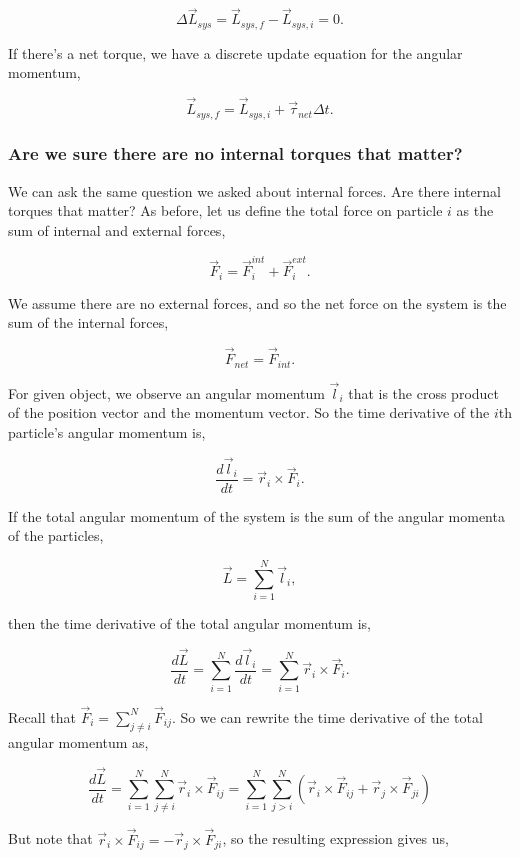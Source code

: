 \documentclass[11pt]{article}
\begin{document}
\[\Delta \vec{L}_{sys} = \vec{L}_{sys,f} - \vec{L}_{sys,i} = 0.\]

If there's a net torque, we have a discrete update equation for the
angular momentum,

\[\vec{L}_{sys,f} = \vec{L}_{sys,i} + \vec{\tau}_{net}\Delta t.\]

\subsubsection{Are we sure there are no internal torques that
matter?}\label{are-we-sure-there-are-no-internal-torques-that-matter}

We can ask the same question we asked about internal forces. Are there
internal torques that matter? As before, let us define the total force
on particle \(i\) as the sum of internal and external forces,

\[\vec{F}_{i} = \vec{F}_{i}^{int} + \vec{F}_{i}^{ext}.\]

We assume there are no external forces, and so the net force on the
system is the sum of the internal forces,

\[\vec{F}_{net} = \vec{F}_{int}.\]

For given object, we observe an angular momentum \(\vec{l}_i\) that is
the cross product of the position vector and the momentum vector. So the
time derivative of the \(i\)th particle's angular momentum is,

\[\dfrac{d\vec{l}_i}{dt} = \vec{r}_i \times \vec{F}_i.\]

If the total angular momentum of the system is the sum of the angular
momenta of the particles,

\[\vec{L} = \sum_{i=1}^{N} \vec{l}_i,\]

then the time derivative of the total angular momentum is,

\[\dfrac{d\vec{L}}{dt} = \sum_{i=1}^{N} \dfrac{d\vec{l}_i}{dt} = \sum_{i=1}^{N} \vec{r}_i \times \vec{F}_i.\]

Recall that \(\vec{F}_i = \sum_{j\neq i}^{N} \vec{F}_{ij}\). So we can
rewrite the time derivative of the total angular momentum as,

\[\dfrac{d\vec{L}}{dt} = \sum_{i=1}^{N} \sum_{j\neq i}^{N} \vec{r}_i  \times \vec{F}_{ij} = \sum_{i=1}^N \sum_{j >i}^{N} \left(\vec{r}_i \times \vec{F}_{ij} + \vec{r}_j \times \vec{F}_{ji}\right)\]

But note that
\(\vec{r}_i \times \vec{F}_{ij} = -\vec{r}_j \times \vec{F}_{ji}\), so
the resulting expression gives us,
\end{document}
